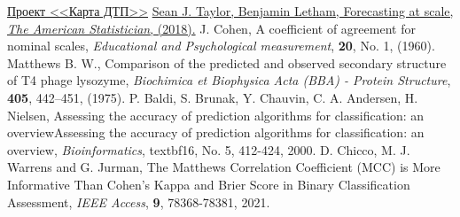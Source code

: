 \begin{thebibliography}{99}
	\href{https://dtp-stat.ru}
	{Проект <<Карта ДТП>>}
	\href{https://peerj.com/preprints/3190.pdf}{Sean J. Taylor, Benjamin Letham, Forecasting at scale, \textit{The American Statistician}, (2018).}
	J. Cohen, A coefficient of agreement for nominal scales, \textit{Educational and Psychological measurement}, \textbf{20}, No. 1, (1960).
	Matthews B. W., Comparison of the predicted and observed secondary structure of T4 phage lysozyme,
	\textit{Biochimica et Biophysica Acta (BBA) - Protein Structure}, \textbf{405}, 442–451, (1975).
	P. Baldi, S. Brunak, Y. Chauvin, C. A. Andersen, H. Nielsen, Assessing the accuracy of prediction algorithms for classification:
	an overviewAssessing the accuracy of prediction algorithms for classification: an overview, \textit{Bioinformatics}, textbf{16}, No. 5, 412-424, 2000.
	\bibitem{}
	D. Chicco, M. J. Warrens and G. Jurman, 
	The Matthews Correlation Coefficient (MCC) is More Informative Than Cohen’s Kappa and Brier Score in Binary Classification Assessment,
	\textit{IEEE Access}, \textbf{9}, 78368-78381, 2021.
\end{thebibliography}
